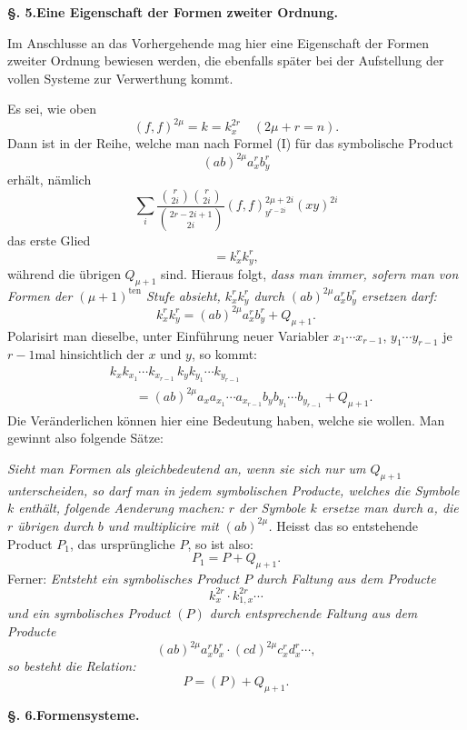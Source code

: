 \documentclass[10pt]{article}
\begin{document}
\begin{center}
{\bfseries §. 5.\quad Eine Eigenschaft der Formen zweiter Ordnung.}
\end{center}

Im Anschlusse an das Vorhergehende mag hier eine Eigenschaft der Formen zweiter Ordnung bewiesen werden, die ebenfalls später bei der Aufstellung der vollen Systeme zur Verwerthung kommt.

Es sei, wie oben
\[
(f,f)^{2\mu}=k=k_x^{2r}\quad (2\mu+r=n).
\]
Dann ist in der Reihe, welche man nach Formel (I) für das symbolische Product
\[
(ab)^{2\mu}a_x^r b_y^r
\]
erhält, nämlich
\[
\sum_i\frac{\binom{r}{2i}\binom{r}{2i}}{\binom{2r-2i+1}{2i}}(f,f)^{2\mu+2i}_{y^{r-2i}}(xy)^{2i}
\]
das erste Glied
\[
=k_x^r k_y^r,
\]
während die übrigen $Q_{\mu+1}$ sind. Hieraus folgt, \emph{dass man immer, sofern man von Formen der $(\mu+1)^{\mathrm{ten}}$ Stufe absieht, $k_x^r k_y^r$ durch $(ab)^{2\mu}a_x^r b_y^r$ ersetzen darf:}
\[
k_x^r k_y^r=(ab)^{2\mu}a_x^r b_y^r+Q_{\mu+1}.
\]
Polarisirt man dieselbe, unter Einführung neuer Variabler $x_1\cdots x_{r-1}$, $y_1\cdots y_{r-1}$ je $r-1$mal hinsichtlich der $x$ und $y$, so kommt:
\[
\begin{aligned}
&k_xk_{x_1}\cdots k_{x_{r-1}}\,k_yk_{y_1}\cdots k_{y_{r-1}}\\
&\qquad =(ab)^{2\mu}a_xa_{x_1}\cdots a_{x_{r-1}}b_yb_{y_1}\cdots b_{y_{r-1}}+Q_{\mu+1}.
\end{aligned}
\]
Die Veränderlichen können hier eine Bedeutung haben, welche sie wollen. Man gewinnt also folgende Sätze:

\emph{Sieht man Formen als gleichbedeutend an, wenn sie sich nur um $Q_{\mu+1}$ unterscheiden, so darf man in jedem symbolischen Producte, welches die Symbole $k$ enthält, folgende Aenderung machen: $r$ der Symbole $k$ ersetze man durch $a$, die $r$ übrigen durch $b$ und multiplicire mit $(ab)^{2\mu}$.} Heisst das so entstehende Product $P_1$, das ursprüngliche $P$, so ist also:
\[
P_1=P+Q_{\mu+1}.
\]
Ferner: \emph{Entsteht ein symbolisches Product $P$ durch Faltung aus dem Producte}
\[
k_x^{2r}\cdot k_{1,x}^{2r}\cdots
\]
\emph{und ein symbolisches Product $(P)$ durch entsprechende Faltung aus dem Producte}
\[
(ab)^{2\mu}a_x^r b_x^r\cdot(cd)^{2\mu}c_x^r d_x^r\cdots,
\]
\emph{so besteht die Relation:}
\[
P=(P)+Q_{\mu+1}.
\]

\begin{center}
{\bfseries §. 6.\quad Formensysteme.}
\end{center}
\end{document}

